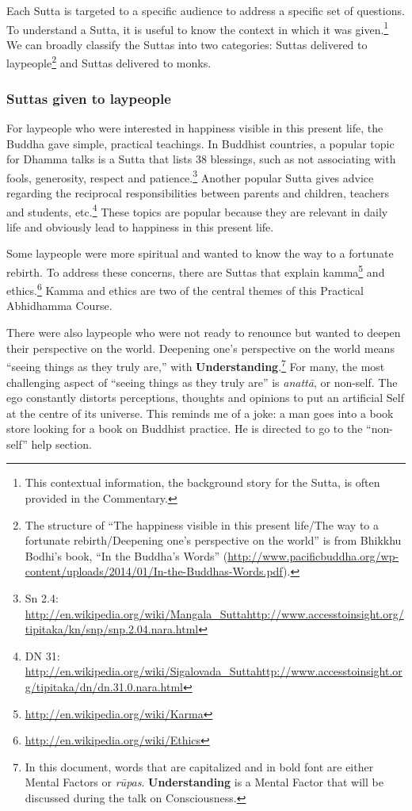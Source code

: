 Each Sutta is targeted to a specific audience to address a specific set of questions. To understand a Sutta, it is useful to know the context in which it was given.\footnote{This contextual information, the background story for the Sutta, is often provided in the Commentary.} We can broadly classify the Suttas into two categories: Suttas delivered to laypeople\footnote{The structure of “The happiness visible in this present life/The way to a fortunate rebirth/Deepening one’s perspective on the world” is from Bhikkhu Bodhi’s book, “In the Buddha’s Words” (\url{http://www.pacificbuddha.org/wp-content/uploads/2014/01/In-the-Buddhas-Words.pdf}).} and Suttas delivered to monks.

\subsubsection*{Suttas given to laypeople}

For laypeople who were interested in happiness visible in this present life, the Buddha gave simple, practical teachings. In Buddhist countries, a popular topic for Dhamma talks is a Sutta that lists 38 blessings, such as not associating with fools, generosity, respect and patience.\footnote{Sn 2.4: \url{http://en.wikipedia.org/wiki/Mangala_Sutta}\newline \url{http://www.accesstoinsight.org/tipitaka/kn/snp/snp.2.04.nara.html}} Another popular Sutta gives advice regarding the reciprocal responsibilities between parents and children, teachers and students, etc.\footnote{DN 31: \url{http://en.wikipedia.org/wiki/Sigalovada_Sutta}\newline \url{http://www.accesstoinsight.org/tipitaka/dn/dn.31.0.nara.html}} These topics are popular because they are relevant in daily life and obviously lead to happiness in this present life.

\pagebreak

Some laypeople were more spiritual and wanted to know the way to a fortunate rebirth. To address these concerns, there are Suttas that explain kamma\footnote{\url{http://en.wikipedia.org/wiki/Karma}} and ethics.\footnote{\url{http://en.wikipedia.org/wiki/Ethics}} Kamma and ethics are two of the central themes of this Practical Abhidhamma Course.

There were also laypeople who were not ready to renounce but wanted to deepen their perspective on the world. Deepening one’s perspective on the world means “seeing things as they truly are,” with \textbf{Understanding}.\footnote{In this document, words that are capitalized and in bold font are either Mental Factors or \textit{rūpas}. \textbf{Understanding} is a Mental Factor that will be discussed during the talk on Consciousness.} For many, the most challenging aspect of “seeing things as they truly are” is \textit{anattā}, or non-self. The ego constantly distorts perceptions, thoughts and opinions to put an artificial Self at the centre of its universe. This reminds me of a joke: a man goes into a book store looking for a book on Buddhist practice. He is directed to go to the “non-self” help section.

